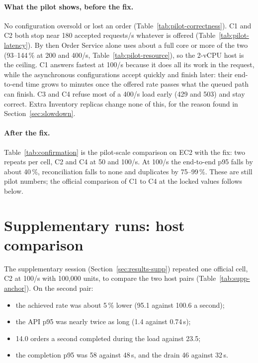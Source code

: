 \documentclass[a4paper]{report}
\begin{document}
\paragraph{What the pilot shows, before the fix.} No configuration oversold or
lost an order (Table~\ref{tab:pilot-correctness}). C1 and C2 both stop near 180
accepted requests/s whatever is offered (Table~\ref{tab:pilot-latency}). By then Order Service alone uses about
a full core or more of the two (93--144\,\% at 200 and 400/s,
Table~\ref{tab:pilot-resource}), so the 2-vCPU host is the ceiling. C1 answers
fastest at 100/s because it does all its work in the request, while the
asynchronous configurations accept quickly and finish later: their end-to-end
time grows to minutes once the offered rate passes what the queued path can
finish. C3 and C4 refuse most of a 400/s load early (429 and 503) and stay
correct. Extra Inventory replicas change none of this, for the reason found in
Section~\ref{sec:slowdown}.

\paragraph{After the fix.} Table~\ref{tab:confirmation} is the pilot-scale
comparison on EC2 with the fix: two repeats per cell, C2 and C4 at 50 and
100/s. At 100/s the end-to-end p95 falls by about 40\,\%, reconciliation falls
to none and duplicates by 75--99\,\%. These are still pilot numbers; the
official comparison of C1 to C4 at the locked values follows below.


\section{Supplementary runs: host comparison}
\label{app:supp-anchor}

The supplementary session (Section~\ref{sec:results-supp}) repeated one
official cell, C2 at 100/s with 100,000 units, to compare the two host pairs
(Table~\ref{tab:supp-anchor}). On the second pair:

\begin{itemize}
  \item the achieved rate was about 5\,\% lower (95.1 against 100.6 a second);
  \item the API p95 was nearly twice as long (1.4 against 0.74\,s);
  \item 14.0 orders a second completed during the load against 23.5;
  \item the completion p95 was 58 against 48\,s, and the drain 46 against 32\,s.
\end{itemize}
\end{document}
